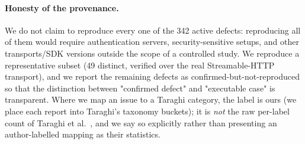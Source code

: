 \paragraph{Honesty of the provenance.} We do not claim to reproduce every one of the 342
active defects: reproducing all of them would require authentication servers, security-sensitive
setups, and other transports/SDK versions outside the scope of a controlled study. We reproduce
a representative subset (49 distinct, verified over the real Streamable-HTTP transport), and we
report the remaining defects as confirmed-but-not-reproduced so that the distinction between
"confirmed defect" and "executable case" is transparent. Where we map an issue to a Taraghi
category, the label is ours (we place each report into Taraghi's taxonomy buckets); it is
\emph{not} the raw per-label count of Taraghi et al.~\cite{taraghi2026real}, and we say so
explicitly rather than presenting an author-labelled mapping as their statistics.